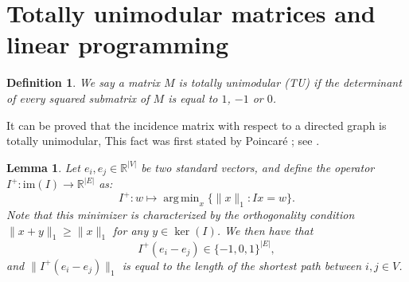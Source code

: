\documentclass{article}
\newtheorem{lemma}{Lemma}[section]
\newtheorem{definition}{Definition}[section]
\newcommand{\im}{\mathrm{im}}
\DeclareMathOperator*{\argmin}{arg\,min}
\begin{document}
\section{Totally unimodular matrices and linear programming}\label{sec:TU}
\begin{definition}
We say a matrix $M$ is totally unimodular (TU) if the determinant of every squared submatrix of $M$ is equal to $1$, $-1$ or $0$.
\end{definition}
It can be proved that the incidence matrix with respect to a directed graph is totally unimodular,
This fact was first stated by Poincar\'{e} \cite{poincare};
see \cite[page 274]{schrijver1986theory}.


\begin{lemma}\label{lemma: tot_unimod}
Let $e_i, e_j\in \mathbb{R}^{|V|}$ be two standard vectors,
and define the operator $I^+: \im(I)\to \mathbb{R}^{|E|}$ as:
\[
I^+: w\mapsto \argmin_x\{ \|x\|_1 : Ix=w \}.
\]
Note that this minimizer is characterized by the orthogonality condition $\|x+y\|_1\geq \|x\|_1$ for any $y\in \ker (I)$.
We then have that
\[
I^+(e_i-e_j)\in \{-1, 0, 1\}^{|E|},
\]
and $\|I^+(e_i-e_j)\|_1$ is equal to the length of the shortest path between $i, j\in V$. 
\end{lemma}
\end{document}

